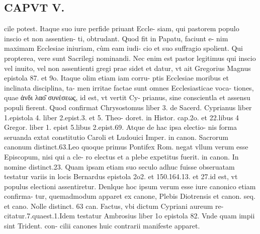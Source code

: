 \documentclass{article}
\begin{document}
\begin{pages}
\section*{CAPVT V. }
\marginpar{[ p.35  ]}\pstart cile potest. Itaque suo iure perfide priuant Eccle- siam, qui pastorem populo inscio et non assentien- ti, obtrudant. Quod fit in Papatu, faciunt e- nim maximam Ecclesiae iniuriam, cùm eam iudi- cio et suo suffragio spolient. Qui propterea, vere sunt Sacrilegi nominandi. Nec enim est pastor legitimus qui inscio vel inuito, vel non assentienti gregi prae sidet et datur, vt ait Gregorius Magnus epistola 87. et 9o. Itaque olim etiam iam corru- ptis Ecclesiae moribus et inclinata disciplina, ta- men irritae factae sunt omnes Ecclesiasticae voca- tiones, quae ἀνδι λαο͂ συνέσεως, id est, vt vertit Cy- prianus, sine conscientla et assensu populi fierent. Quod confirmat Chrysostomus liber 3. de Sacerd. Cyprianus liber 1.epistola 4. liber 2.epist.3. et 5. Theo- doret. in Histor. cap.2o. et 22.libus 4 Gregor. liber 1. epist 5.libus 2.epist.69. Atque de hac ipsa electio- nis forma seruanda extat constitutio Caroli et Ludouici Imper. in canon. Sacrorum canonum distinct.63.Leo quoque primus Pontifex Rom. negat vllum verum esse Episcopum, nisi qui a cle- ro electus et a plebe expetitus fuerit. in canon. In nomine distinct.23. Quam ipsam etiam suo seculo adhuc fuisse obseruatam testatur variis in locis Bernardus epistola 2o2. et 150.164.13. et 27.id est, vt populus electioni assentiretur. Denlque hoc ipsum verum esse iure canonico etiam confirma- tur, quemadmodum apparet ex canone, Plebis Diotrensis et canon. seq. et cano. Nolle distinct. 63 can. Factus, vbi dictum Cypriani aureum re- citatur.7.quaest.1.Idem testatur Ambrosius liber 1o epistola 82. Vnde quam impii sint Trident. con- cilii canones huic contrarii manifeste apparet.  \pend

\end{pages}
\end{document}
